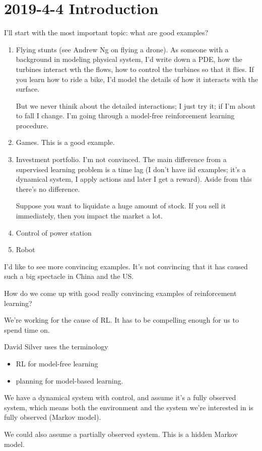 \section{2019-4-4 Introduction}
I'll start with the most important topic: what are good examples?
\begin{enumerate}
\item
Flying stunts (see Andrew Ng on flying a drone). 
As someone with a background in modeling physical system, I'd write down a PDE, how the turbines interact wth the flows, how to control the turbines so that it flies. 
If you learn how to ride a bike, I'd model the details of how it interacts with the surface.

But we never thinik about the detailed interactions; I just try it; if I'm about to fall I change. I'm going through a model-free reinforcement learning procedure.
\item
Games. This is a good example.
\item
Investment portfolio. I'm not convinced. The main difference from a supervised learning problem is a time lag (I don't have iid examples; it's a dynamical system, I apply actions and later I get a reward). Aside from this there's no difference.

Suppose you want to liquidate a huge amount of stock. If you sell it immediately, then you impact the market a lot. %
\item
Control of power station
\item
Robot
\end{enumerate}
I'd like to see more convincing examples. It's not convincing that it has caused such a big spectacle in China and the US.

How do we come up with good really convincing examples of reinforcement learning?

We're working for the cause of RL. It has to be compelling enough for us to spend time on. 

David Silver uses the terminology
\begin{itemize}
\item
RL for model-free learning
\item
planning for model-based learning.
\end{itemize}
We have a dynamical system with control, and assume it's a fully observed system, which means both the environment and the system we're interested in is fully observed (Markov model).

We could also assume a partially observed system. This is a hidden Markov model.

